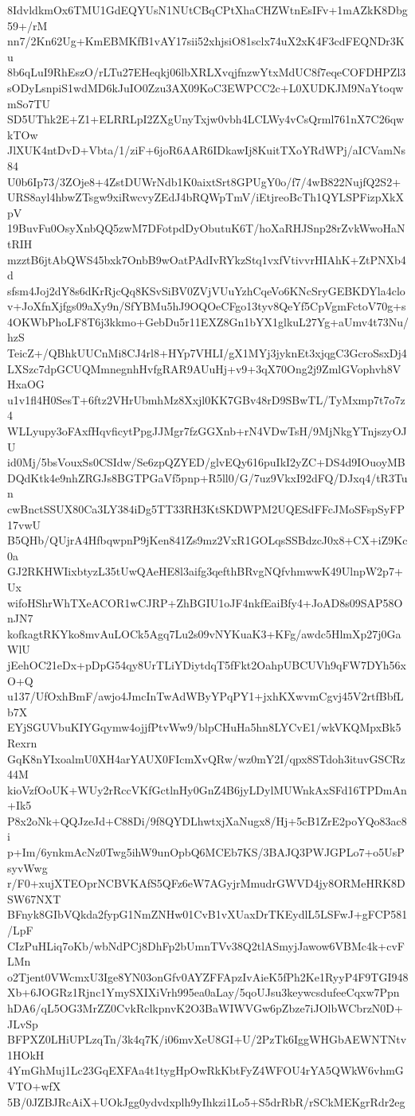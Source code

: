 8IdvldkmOx6TMU1GdEQYUsN1NUtCBqCPtXhaCHZWtnEsIFv+1mAZkK8Dbg59+/rM
nn7/2Kn62Ug+KmEBMKfB1vAY17sii52xhjsiO81sclx74uX2xK4F3cdFEQNDr3Ku
8b6qLuI9RhEszO/rLTu27EHeqkj06lbXRLXvqjfnzwYtxMdUC8f7eqeCOFDHPZl3
sODyLsnpiS1wdMD6kJuIO0Zzu3AX09KoC3EWPCC2c+L0XUDKJM9NaYtoqwmSo7TU
SD5UThk2E+Z1+ELRRLpI2ZXgUnyTxjw0vbh4LCLWy4vCsQrml761nX7C26qwkTOw
JlXUK4ntDvD+Vbta/1/ziF+6joR6AAR6IDkawIj8KuitTXoYRdWPj/aICVamNs84
U0b6Ip73/3ZOje8+4ZstDUWrNdb1K0aixtSrt8GPUgY0o/f7/4wB822NujfQ2S2+
URS8ayl4hbwZTsgw9xiRwcvyZEdJ4bRQWpTmV/iEtjreoBcTh1QYLSPFizpXkXpV
19BuvFu0OsyXnbQQ5zwM7DFotpdDyObutuK6T/hoXaRHJSnp28rZvkWwoHaNtRIH
mzztB6jtAbQWS45bxk7OnbB9wOatPAdIvRYkzStq1vxfVtivvrHIAhK+ZtPNXb4d
sfsm4Joj2dY8s6dKrRjcQq8KSvSiBV0ZVjVUuYzhCqeVo6KNcSryGEBKDYla4clo
v+JoXfnXjfgs09aXy9n/SfYBMu5hJ9OQOeCFgo13tyv8QeYf5CpVgmFctoV70g+s
4OKWbPhoLF8T6j3kkmo+GebDu5r11EXZ8Gn1bYX1glkuL27Yg+aUmv4t73Nu/hzS
TeicZ+/QBhkUUCnMi8CJ4rl8+HYp7VHLI/gX1MYj3jyknEt3xjqgC3GcroSsxDj4
LXSzc7dpGCUQMmnegnhHvfgRAR9AUuHj+v9+3qX70Ong2j9ZmlGVophvh8VHxaOG
u1v1fl4H0SesT+6ftz2VHrUbmhMz8Xxjl0KK7GBv48rD9SBwTL/TyMxmp7t7o7z4
WLLyupy3oFAxfHqvficytPpgJJMgr7fzGGXnb+rN4VDwTsH/9MjNkgYTnjszyOJU
id0Mj/5bsVouxSs0CSIdw/Se6zpQZYED/glvEQy616puIkI2yZC+DS4d9IOuoyMB
DQdKtk4e9nhZRGJs8BGTPGaVf5pnp+R5ll0/G/7uz9VkxI92dFQ/DJxq4/tR3Tun
cwBnctSSUX80Ca3LY384iDg5TT33RH3KtSKDWPM2UQESdFFcJMoSFspSyFP17vwU
B5QHb/QUjrA4HfbqwpnP9jKen841Zs9mz2VxR1GOLqsSSBdzcJ0x8+CX+iZ9Kc0a
GJ2RKHWIixbtyzL35tUwQAeHE8l3aifg3qefthBRvgNQfvhmwwK49UlnpW2p7+Ux
wifoHShrWhTXeACOR1wCJRP+ZhBGIU1oJF4nkfEaiBfy4+JoAD8s09SAP58OnJN7
kofkagtRKYko8mvAuLOCk5Agq7Lu2s09vNYKuaK3+KFg/awdc5HlmXp27j0GaWlU
jEehOC21eDx+pDpG54qy8UrTLiYDiytdqT5fFkt2OahpUBCUVh9qFW7DYh56xO+Q
u137/UfOxhBmF/awjo4JmcInTwAdWByYPqPY1+jxhKXwvmCgvj45V2rtfBbfLb7X
EYjSGUVbuKIYGqymw4ojjfPtvWw9/blpCHuHa5hn8LYCvE1/wkVKQMpxBk5Rexrn
GqK8nYIxoalmU0XH4arYAUX0FIcmXvQRw/wz0mY2I/qpx8STdoh3ituvGSCRz44M
kioVzfOoUK+WUy2rRccVKfGctlnHy0GnZ4B6jyLDylMUWnkAxSFd16TPDmAn+Ik5
P8x2oNk+QQJzeJd+C88Di/9f8QYDLhwtxjXaNugx8/Hj+5cB1ZrE2poYQo83ac8i
p+Im/6ynkmAcNz0Twg5ihW9unOpbQ6MCEb7KS/3BAJQ3PWJGPLo7+o5UsPsyvWwg
r/F0+xujXTEOprNCBVKAfS5QFz6eW7AGyjrMmudrGWVD4jy8ORMeHRK8DSW67NXT
BFnyk8GIbVQkda2fypG1NmZNHw01CvB1vXUaxDrTKEydlL5LSFwJ+gFCP581/LpF
CIzPuHLiq7oKb/wbNdPCj8DhFp2bUmnTVv38Q2tlASmyjJawow6VBMc4k+cvFLMn
o2Tjent0VWcmxU3Ige8YN03onGfv0AYZFFApzIvAieK5fPh2Ke1RyyP4F9TGI948
Xb+6JOGRz1Rjnc1YmySXIXiVrh995ea0aLay/5qoUJsu3keywcsdufeeCqxw7Ppn
hDA6/qL5OG3MrZZ0CvkRclkpnvK2O3BaWIWVGw6pZbze7iJOlbWCbrzN0D+JLvSp
BFPXZ0LHiUPLzqTn/3k4q7K/i06mvXeU8GI+U/2PzTk6IggWHGbAEWNTNtv1HOkH
4YmGhMuj1Lc23GqEXFAa4t1tygHpOwRkKbtFyZ4WFOU4rYA5QWkW6vhmGVTO+wfX
5B/0JZBJRcAiX+UOkJgg0ydvdxplh9yIhkzi1Lo5+S5drRbR/rSCkMEKgrRdr2eg
